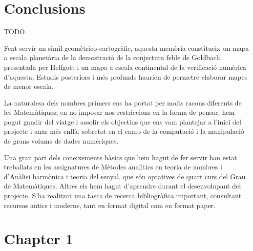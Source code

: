\documentclass[11pt,a4paper,openright,oneside]{book}
\numberwithin{equation}{section}
\newtheorem{defn0}{Definition}[chapter]
\newenvironment{definition}{ \begin{defn0}}{\end{defn0}}
\begin{document}
\chapter{Conclusions}

TODO

Fent servir un s\'{\i}mil geom\`etrico-cartogr\`afic, aquesta mem\`oria constitueix un mapa a escala planet\`aria de la demostraci\'o de la conjectura feble de Goldbach presentada per Helfgott i un mapa a escala continental de la verificaci\'o num\`erica d'aquesta. Estudis posteriors i m\'es profunds haurien de permetre elaborar mapes de menor escala.

La naturalesa dels nombres primers ens ha portat per molts racons diferents de les Matem\`atiques; en no imposar-nos restriccions en la forma de pensar, hem pogut gaudir del viatge i assolir els objectius que ens vam plantejar a l'inici del projecte i anar m\'es enll\`a, sobretot en el camp de la computaci\'o i la manipulaci\'o de grans volums de dades num\`eriques.

Una gran part dels coneixements b\`asics que hem hagut de fer servir han estat treballats en les assignatures de M\`etodes anal\'{\i}tics en teoria de nombres i d'An\`alisi harm\`onica i teoria del senyal, que s\'on optatives de quart curs del Grau de Ma\-te\-m\`a\-ti\-ques. Altres els hem hagut d'aprendre durant el desenvolupant del projecte. S'ha realitzat una tasca de recerca bibliogr\`afica important, consultant recursos antics i moderns, tant en format digital com en format paper.

\normalfont


\newpage

\printbibliography

\appendix
\chapter{Chapter 1}




 
\end{document}
